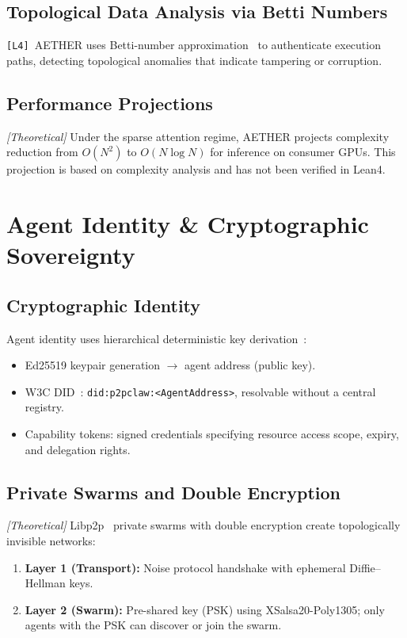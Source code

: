 \documentclass[11pt,a4paper]{article}
\theoremstyle{plain}
\theoremstyle{definition}
\theoremstyle{remark}
\begin{document}
\subsection{Topological Data Analysis via Betti Numbers}

\texttt{[L4\checkmark]}~AETHER uses Betti-number approximation~\cite{edelsbrunner2010} to
authenticate execution paths, detecting topological anomalies that indicate tampering or
corruption.

\subsection{Performance Projections}

\emph{[Theoretical]} Under the sparse attention regime, AETHER projects complexity reduction from
$O(N^2)$ to $O(N \log N)$ for inference on consumer GPUs.  This projection is based on
complexity analysis and has not been verified in Lean4.

\section{Agent Identity \& Cryptographic Sovereignty}

\subsection{Cryptographic Identity}

Agent identity uses hierarchical deterministic key derivation~\cite{antonopoulos2017}:
\begin{itemize}
  \item Ed25519 keypair generation $\to$ agent address (public key).
  \item W3C DID~\cite{w3c_did}: \texttt{did:p2pclaw:<AgentAddress>}, resolvable without a
    central registry.
  \item Capability tokens: signed credentials specifying resource access scope, expiry, and
    delegation rights.
\end{itemize}

\subsection{Private Swarms and Double Encryption}

\emph{[Theoretical]} Libp2p~\cite{libp2p} private swarms with double encryption create
topologically invisible networks:
\begin{enumerate}
  \item \textbf{Layer 1 (Transport):} Noise protocol handshake with ephemeral Diffie--Hellman
    keys.
  \item \textbf{Layer 2 (Swarm):} Pre-shared key (PSK) using XSalsa20-Poly1305; only agents
    with the PSK can discover or join the swarm.
\end{enumerate}
\end{document}
